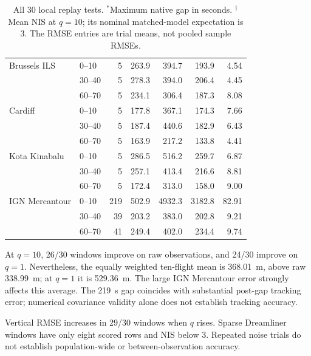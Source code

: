 \documentclass[12pt,a4paper]{article}
\begin{document}
\begin{table}[H]
\begin{tabular}{llrrrrr}
\addlinespace[2pt]
Brussels ILS & 0--10 & 5 & 263.9 & 394.7 & 193.9 & 4.54 \\
 & 30--40 & 5 & 278.3 & 394.0 & 206.4 & 4.45 \\
 & 60--70 & 5 & 234.1 & 306.4 & 187.3 & 8.08 \\
\addlinespace[2pt]
Cardiff & 0--10 & 5 & 177.8 & 367.1 & 174.3 & 7.66 \\
 & 30--40 & 5 & 187.4 & 440.6 & 182.9 & 6.43 \\
 & 60--70 & 5 & 163.9 & 217.2 & 133.8 & 4.41 \\
\addlinespace[2pt]
Kota Kinabalu & 0--10 & 5 & 286.5 & 516.2 & 259.7 & 6.87 \\
 & 30--40 & 5 & 257.1 & 413.4 & 216.6 & 8.81 \\
 & 60--70 & 5 & 172.4 & 313.0 & 158.0 & 9.00 \\
\addlinespace[2pt]
IGN Mercantour & 0--10 & 219 & 502.9 & 4932.3 & 3182.8 & 82.91 \\
 & 30--40 & 39 & 203.2 & 383.0 & 202.8 & 9.21 \\
 & 60--70 & 41 & 249.4 & 402.0 & 234.4 & 9.74 \\
\bottomrule\end{tabular}
\caption{All 30 local replay tests. $^*$Maximum native gap in seconds. $^\dagger$Mean NIS at $q=10$; its nominal matched-model expectation is 3. The RMSE entries are trial means, not pooled sample RMSEs.}
\end{table}
At $q=10$, 26/30 windows improve on raw observations, and 24/30 improve on $q=1$. Nevertheless, the equally weighted ten-flight mean is 368.01~m, above raw 338.99~m; at $q=1$ it is 529.36~m. The large IGN Mercantour error strongly affects this average. The 219~s gap coincides with substantial post-gap tracking error; numerical covariance validity alone does not establish tracking accuracy.

Vertical RMSE increases in 29/30 windows when $q$ rises. Sparse Dreamliner windows have only eight scored rows and NIS below 3. Repeated noise trials do not establish population-wide or between-observation accuracy.
\clearpage
\end{document}
